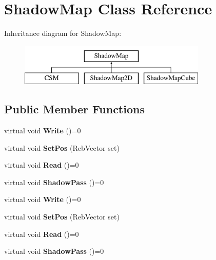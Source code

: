 \hypertarget{class_shadow_map}{}\section{Shadow\+Map Class Reference}
\label{class_shadow_map}
Inheritance diagram for Shadow\+Map\+:\begin{figure}[H]
\begin{center}
\leavevmode
\includegraphics[height=2.000000cm]{class_shadow_map}
\end{center}
\end{figure}
\subsection*{Public Member Functions}
\begin{DoxyCompactItemize}
\item 
virtual void {\bfseries Write} ()=0\hypertarget{class_shadow_map_a91e4f9846d231ad496cea0ee28e824bb}{}\label{class_shadow_map_a91e4f9846d231ad496cea0ee28e824bb}

\item 
virtual void {\bfseries Set\+Pos} (Reb\+Vector set)\hypertarget{class_shadow_map_add0eb7df84d9e77dcba933950ff6e26e}{}\label{class_shadow_map_add0eb7df84d9e77dcba933950ff6e26e}

\item 
virtual void {\bfseries Read} ()=0\hypertarget{class_shadow_map_a267da7ad6330bb165e4d78679451c3e3}{}\label{class_shadow_map_a267da7ad6330bb165e4d78679451c3e3}

\item 
virtual void {\bfseries Shadow\+Pass} ()=0\hypertarget{class_shadow_map_a7486a32b3124d5850f135d1e6208b682}{}\label{class_shadow_map_a7486a32b3124d5850f135d1e6208b682}

\item 
virtual void {\bfseries Write} ()=0\hypertarget{class_shadow_map_a91e4f9846d231ad496cea0ee28e824bb}{}\label{class_shadow_map_a91e4f9846d231ad496cea0ee28e824bb}

\item 
virtual void {\bfseries Set\+Pos} (Reb\+Vector set)\hypertarget{class_shadow_map_ae7cf64780a94df619b63ddef4c4f144e}{}\label{class_shadow_map_ae7cf64780a94df619b63ddef4c4f144e}

\item 
virtual void {\bfseries Read} ()=0\hypertarget{class_shadow_map_a267da7ad6330bb165e4d78679451c3e3}{}\label{class_shadow_map_a267da7ad6330bb165e4d78679451c3e3}

\item 
virtual void {\bfseries Shadow\+Pass} ()=0\hypertarget{class_shadow_map_a7486a32b3124d5850f135d1e6208b682}{}\label{class_shadow_map_a7486a32b3124d5850f135d1e6208b682}

\end{DoxyCompactItemize}
